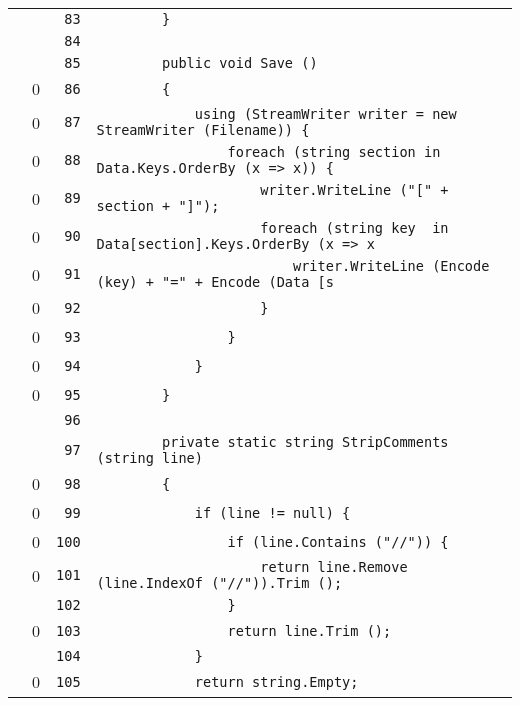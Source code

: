 \documentclass[a4paper,10pt]{article}
\begin{document}
\begin{longtable}[l]{lrrl}
\cellcolor{gray} &  & \verb~83~ & \verb~        }~\\
\cellcolor{gray} &  & \verb~84~ & \verb~~\\
\cellcolor{gray} &  & \verb~85~ & \verb~        public void Save ()~\\
\cellcolor{red} & 0 & \verb~86~ & \verb~        {~\\
\cellcolor{red} & 0 & \verb~87~ & \verb~            using (StreamWriter writer = new StreamWriter (Filename)) {~\\
\cellcolor{red} & 0 & \verb~88~ & \verb~                foreach (string section in Data.Keys.OrderBy (x => x)) {~\\
\cellcolor{red} & 0 & \verb~89~ & \verb~                    writer.WriteLine ("[" + section + "]");~\\
\cellcolor{red} & 0 & \verb~90~ & \verb~                    foreach (string key  in Data[section].Keys.OrderBy (x => x~\\
\cellcolor{red} & 0 & \verb~91~ & \verb~                        writer.WriteLine (Encode (key) + "=" + Encode (Data [s~\\
\cellcolor{red} & 0 & \verb~92~ & \verb~                    }~\\
\cellcolor{red} & 0 & \verb~93~ & \verb~                }~\\
\cellcolor{red} & 0 & \verb~94~ & \verb~            }~\\
\cellcolor{red} & 0 & \verb~95~ & \verb~        }~\\
\cellcolor{gray} &  & \verb~96~ & \verb~~\\
\cellcolor{gray} &  & \verb~97~ & \verb~        private static string StripComments (string line)~\\
\cellcolor{red} & 0 & \verb~98~ & \verb~        {~\\
\cellcolor{red} & 0 & \verb~99~ & \verb~            if (line != null) {~\\
\cellcolor{red} & 0 & \verb~100~ & \verb~                if (line.Contains ("//")) {~\\
\cellcolor{red} & 0 & \verb~101~ & \verb~                    return line.Remove (line.IndexOf ("//")).Trim ();~\\
\cellcolor{gray} &  & \verb~102~ & \verb~                }~\\
\cellcolor{red} & 0 & \verb~103~ & \verb~                return line.Trim ();~\\
\cellcolor{gray} &  & \verb~104~ & \verb~            }~\\
\cellcolor{red} & 0 & \verb~105~ & \verb~            return string.Empty;~\\

\end{longtable}
\end{document}
